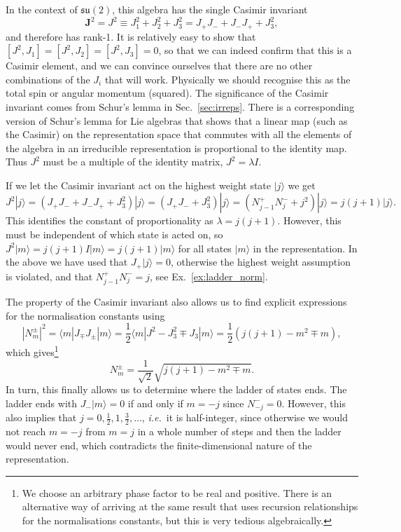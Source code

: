 \documentclass[notes.tex]{subfiles}
\begin{document}
In the context of $\mathfrak{su}(2)$, this algebra has the single Casimir invariant
\[ \mathbf J^2=J^2\equiv J_1^2+J_2^2+J_3^2=J_+J_-+J_-J_++J_3^2, \]
and therefore has rank-1. It is relatively easy to show that $[J^2,J_1]=[J^2,J_2]=[J^2,J_3]=0$, so that we can indeed confirm that this is a Casimir element, and we can convince ourselves that there are no other combinations of the $J_i$ that will work. Physically we should recognise this as the total spin or angular momentum (squared). The significance of the Casimir invariant comes from Schur's lemma in Sec.~\ref{sec:irreps}. There is a corresponding version of Schur's lemma for Lie algebras that shows that a linear map (such as the Casimir) on the representation space that commutes with all the elements of the algebra in an irreducible representation  is proportional to the identity map. Thus $J^2$ must be a multiple of the identity matrix, $J^2=\lambda I$.

If we let the Casimir invariant act on the highest weight state $|j\rangle$ we get
\[ J^2 |j\rangle=(J_+J_-+J_-J_++J_3^2) |j\rangle=(J_+J_-+J_3^2) |j\rangle=(N_{j-1}^+N_j^-+j^2) |j\rangle=j(j+1) |j\rangle. \]
This identifies the constant of proportionality as $\lambda = j(j+1)$. However, this must be independent of which state is acted on, so $J^2|m\rangle=j(j+1)I|m\rangle=j(j+1)|m\rangle$ for all states $|m\rangle$ in the representation.
In the above we have used  that $J_+|j\rangle=0$, otherwise the highest weight assumption is violated, and that $N_{j-1}^+N_j^-=j$, see Ex.~\ref{ex:ladder_norm}.

The property of the Casimir invariant also allows us to find explicit expressions for the normalisation constants using
\[|N_m^\pm|^2= \langle m|J_\mp J_\pm |m\rangle
= \frac{1}{2}\langle m| J^2-J_3^2\mp J_3 |m\rangle=\frac{1}{2}( j(j+1)-m^2\mp m),  \]
which gives\footnote{We choose an arbitrary phase factor to be real and positive. There is an alternative way of arriving at the same result that uses recursion relationships for the normalisations constants, but this is very  tedious algebraically.}
\begin{equation*}
N^\pm_m = \frac{1}{\sqrt{2}}\sqrt{ j(j+1)-m^2\mp m }.
\end{equation*}
In turn, this finally allows us to determine where the ladder of states ends. The ladder ends with $J_-|m\rangle=0$ if and only if $m=-j$ since $N_{-j}^-=0$. However, this also implies that $j=0,\frac{1}{2},1,\frac{3}{2},\ldots$, {\it i.e.}\ it is half-integer, since otherwise we would not reach $m=-j$ from $m=j$ in a whole number of steps and then the ladder would never end, which contradicts the finite-dimensional nature of the representation.
\end{document}

